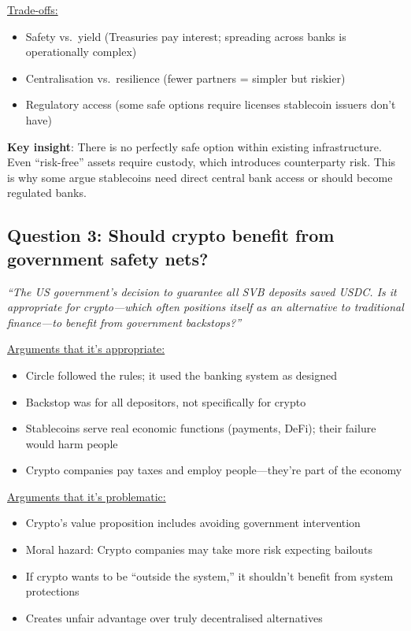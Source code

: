 \documentclass[11pt]{article}
\begin{document}
\medskip
\noindent\underline{Trade-offs:}
\begin{itemize}[leftmargin=*]
\item Safety vs.\ yield (Treasuries pay interest; spreading across banks is operationally complex)
\item Centralisation vs.\ resilience (fewer partners = simpler but riskier)
\item Regulatory access (some safe options require licenses stablecoin issuers don't have)
\end{itemize}

\medskip
\noindent\textbf{Key insight}: There is no perfectly safe option within existing infrastructure. Even ``risk-free'' assets require custody, which introduces counterparty risk. This is why some argue stablecoins need direct central bank access or should become regulated banks.

\subsection*{Question 3: Should crypto benefit from government safety nets?}

\textit{``The US government's decision to guarantee all SVB deposits saved USDC. Is it appropriate for crypto---which often positions itself as an alternative to traditional finance---to benefit from government backstops?''}

\medskip
\noindent\underline{Arguments that it's appropriate:}
\begin{itemize}[leftmargin=*]
\item Circle followed the rules; it used the banking system as designed
\item Backstop was for all depositors, not specifically for crypto
\item Stablecoins serve real economic functions (payments, DeFi); their failure would harm people
\item Crypto companies pay taxes and employ people---they're part of the economy
\end{itemize}

\medskip
\noindent\underline{Arguments that it's problematic:}
\begin{itemize}[leftmargin=*]
\item Crypto's value proposition includes avoiding government intervention
\item Moral hazard: Crypto companies may take more risk expecting bailouts
\item If crypto wants to be ``outside the system,'' it shouldn't benefit from system protections
\item Creates unfair advantage over truly decentralised alternatives
\end{itemize}
\end{document}
